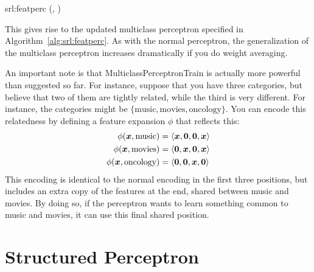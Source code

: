 \newalgorithm%
  {srl:featperc}%
  {(, )}
  {
        \ENDIF
      \ENDFOR
    \ENDFOR
    \RETURN \VAR{$\vw$}
  }

This gives rise to the updated multiclass perceptron specified in Algorithm~\ref{alg:srl:featperc}.
As with the normal perceptron, the generalization of the multiclass perceptron increases dramatically if you do weight averaging.


An important note is that MulticlassPerceptronTrain is actually more powerful than suggested so far.
For instance, suppose that you have three categories, but believe that two of them are tightly related, while the third is very different.
For instance, the categories might be $\{ \text{music}, \text{movies}, \text{oncology} \}$.
You can encode this relatedness by defining a feature expansion $\phi$ that reflects this:
\begin{align}
  \phi({\boldsymbol{x}}, \text{music})    &= \langle {\boldsymbol{x}},    \boldsymbol{0}, \boldsymbol{0}, {\boldsymbol{x}} \rangle \\
  \phi({\boldsymbol{x}}, \text{movies})   &= \langle \boldsymbol{0}, {\boldsymbol{x}}   , \boldsymbol{0}, {\boldsymbol{x}} \rangle \\
  \phi({\boldsymbol{x}}, \text{oncology}) &= \langle \boldsymbol{0}, \boldsymbol{0}, {\boldsymbol{x}}   , \boldsymbol{0} \rangle
\end{align}
This encoding is identical to the normal encoding in the first three positions, but includes an extra copy of the features at the end, shared between music and movies.
By doing so, if the perceptron wants to learn something common to music and movies, it can use this final shared position.

\section{Structured Perceptron}

